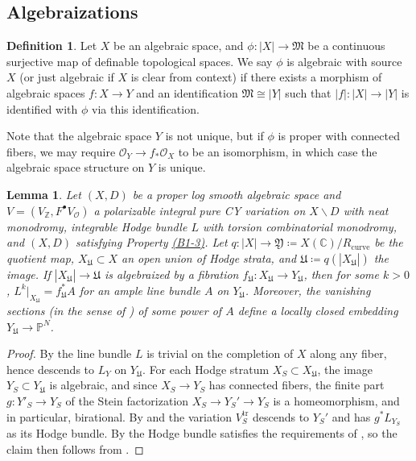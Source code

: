\documentclass{amsart}
\newcommand{\customref}[2]{\hyperref[#1]{#2}}
\newcommand{\bs}{\backslash}
\newtheorem{lem}[theorem]{Lemma}
\theoremstyle{definition}
\newtheorem{defn}[theorem]{Definition}
\theoremstyle{remark}
\def\bZ{\mathbb{Z}}
\def\bC{\mathbb{C}}
\def\bP{\mathbb{P}}
\def\cO{\mathcal{O}}
\def\trans{\mathrm{tr}}
\def\curve{\mathrm{curve}}
\def\fY{\mathfrak{Y}}
\def\fU{\mathfrak{U}}
\numberwithin{equation}{section}
\begin{document}

\subsection{Algebraizations}\label{subsect:algebraize}
\begin{defn}
Let $X$ be an algebraic space, and $\phi:|X|\to \mathfrak{M}$ be a continuous surjective map of definable topological spaces. We say $\phi$ is algebraic with source $X$ (or just algebraic if $X$ is clear from context) if there exists a morphism of algebraic spaces $f:X\to Y$ and an identification $\mathfrak{M}\cong |Y| $ such that $|f|:|X|\to |Y|$ is identified with $\phi$ via this identification.
\end{defn}

Note that the algebraic space $Y$ is not unique, but if $\phi$ is proper with connected fibers, we may require $\cO_Y\to f_*\cO_X$ to be an isomorphism, in which case the algebraic space structure on $Y$ is unique. 



\begin{lem}\label{lemma:semiample on open}Let $(X,D)$ be a proper log smooth algebraic space and $V=(V_\bZ,F^\bullet V_\cO)$ a polarizable integral pure CY variation on $X\bs D$ with neat monodromy, integrable Hodge bundle $L$ with torsion combinatorial monodromy, and $(X,D)$ satisfying Property \customref{b3}{(B1-3)}.    Let $q \colon |X|\to \fY\coloneqq  X(\bC)/R_\curve$ be the quotient map, $X_\mathfrak{U}\subset X$ an open union of Hodge strata, and $\mathfrak{U}\coloneqq  q(|X_\mathfrak{U}|)$ the image.  If $|X_\mathfrak{U}|\to\mathfrak{U}$ is algebraized by a fibration $f_\mathfrak{U}:X_\mathfrak{U}\to Y_\mathfrak{U}$, then for some $k>0$, $L^k|_{X_\mathfrak{U}}=f_{\mathfrak{U}}^*A$ for an ample line bundle $A$ on $Y_\mathfrak{U}$.  Moreover, the vanishing sections (in the sense of ) of some power of $A$ define a locally closed embedding $Y_\mathfrak{U}\to \bP^N$.
\end{lem}
\begin{proof}By  the line bundle $L$ is trivial on the completion of $X$ along any fiber, hence descends to $L_Y$ on $Y_\mathfrak{U}$.  For each Hodge stratum $X_S\subset X_\fU$, the image $Y_S\subset Y_\fU$ is algebraic, and since $X_S\to Y_S$ has connected fibers, the finite part $g:Y'_S\to Y_S$ of the Stein factorization $X_S\to Y_S'\to Y_S$ is a homeomorphism, and in particular, birational.  By  and  the variation $V^\trans_S$ descends to $Y_S'$ and has $g^*L_{Y_S}$ as its Hodge bundle.  By  the Hodge bundle satisfies the requirements of , so the claim then follows from .
\end{proof}
\end{document}
